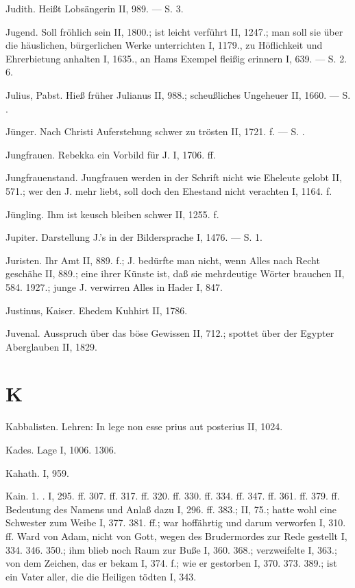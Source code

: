 Judith. Heißt Lobsängerin II, 989. — S.  3.

Jugend. Soll fröhlich sein II, 1800.; ist leicht verführt II, 1247.; man soll sie über die häuslichen, bürgerlichen Werke unterrichten I, 1179., zu Höflichkeit und Ehrerbietung anhalten I, 1635., an Hams Exempel fleißig erinnern I, 639. — S.  2. 6.

Julius, Pabst. Hieß früher Julianus II, 988.; scheußliches Ungeheuer II, 1660. — S. .

Jünger. Nach Christi Auferstehung schwer zu trösten II, 1721. f. — S. .

Jungfrauen. Rebekka ein Vorbild für J. I, 1706. ff.

Jungfrauenstand. Jungfrauen werden in der Schrift nicht wie Eheleute gelobt II, 571.; wer den J. mehr liebt, soll doch den Ehestand nicht verachten I, 1164. f.

Jüngling. Ihm ist keusch bleiben schwer II, 1255. f.

Jupiter. Darstellung J.’s in der Bildersprache I, 1476. — S.  1.

Juristen. Ihr Amt II, 889. f.; J. bedürfte man nicht, wenn Alles nach Recht geschähe II, 889.; eine ihrer Künste ist, daß sie mehrdeutige Wörter brauchen II, 584. 1927.; junge J. verwirren Alles in Hader I, 847.

Justinus, Kaiser. Ehedem Kuhhirt II, 1786.

Juvenal. Ausspruch über das böse Gewissen II, 712.; spottet über der Egypter Aberglauben II, 1829.

\section{K}

Kabbalisten. Lehren: In lege non esse prius aut posterius II, 1024.

Kades. Lage I, 1006. 1306.

Kahath. I, 959.

Kain. 1. . I, 295. ff. 307. ff. 317. ff. 320. ff. 330. ff. 334. ff. 347. ff. 361. ff. 379. ff. Bedeutung des Namens und Anlaß dazu I, 296. ff. 383.; II, 75.;
hatte wohl eine Schwester zum Weibe I, 377. 381. ff.; war hoffährtig und darum verworfen I, 310. ff. Ward von Adam, nicht von Gott, wegen des Brudermordes zur Rede gestellt I, 334. 346. 350.; ihm blieb noch Raum zur Buße I, 360. 368.; verzweifelte I, 363.; von dem Zeichen, das er bekam I, 374. f.; wie er gestorben I, 370. 373. 389.; ist ein Vater aller, die die Heiligen tödten I, 343.

